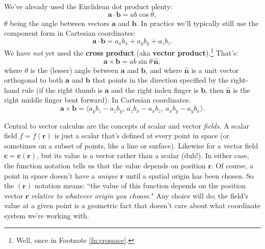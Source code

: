 \documentclass[12pt]{article}
\renewcommand{\vv}[1]{\mathbf{#1}}
\begin{document}
We've already used the Euclidean dot product plenty:
\begin{equation*}
\vv a \cdot \vv b = a b \cos \theta ,
\end{equation*}
$\theta$ being the angle between vectors $\vv a$ and $\vv b$. In practice we'll typically still use the component form in Cartesian coordinates:
\begin{equation*}
\vv a \cdot \vv b = a_x b_x + a_y b_y + a_z b_z.
\end{equation*}
We have \emph{not} yet used the \textbf{cross product} (aka \textbf{vector product}).\footnote{Well, once in Footnote \ref{fn:crossacc}.} That's:
\begin{equation*}
\vv a \times \vv b = a b \sin \theta \, \vv{\hat{n}} ,
\end{equation*}
where $\theta$ is the (lesser) angle between $\vv a$ and $\vv b$, and where $\vv{\hat{n}}$ is a unit vector orthogonal to both $\vv a$ and $\vv b$ that points in the direction specified by the right-hand rule (if the right thumb is $\vv a$ and the right index finger is $\vv b$, then $\vv{\hat{n}}$ is the right middle finger bent forward). In Cartesian coordinates:
\begin{equation*}
\vv a \times \vv b = \big \langle a_y b_z - a_z b_y, \, a_z b_x - a_x b_z, \, a_x b_y - a_y b_x \big \rangle .
\end{equation*}

Central to vector calculus are the concepts of scalar and vector \emph{fields}. A scalar field $f = f(\vv r)$ is just a scalar that's defined at every point in space (or sometimes on a subset of points, like a line or surface). Likewise for a vector field $\vv c = \vv c (\vv r)$, but its value is a vector rather than a scalar (duh!). In either case, the function notation tells us that the value depends on position $\vv r$. Of course, a point in space doesn't have a \emph{unique} $\vv r$ until a spatial origin has been chosen. So the $(\vv r)$ notation means: ``the value of this function depends on the position vector $\vv r$ \emph{relative to whatever origin you choose}." Any choice will do; the field's value at a given point is a geometric fact that doesn't care about what coordinate system we're working with.
\end{document}
